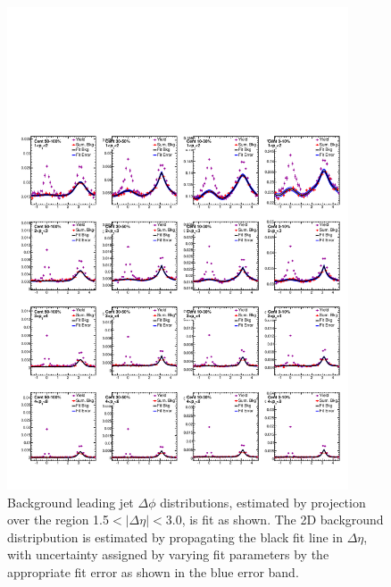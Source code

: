 \begin{figure}[hbtp]
\begin{center}
\includegraphics[width=0.9\textwidth]{figures/Appendices/Fits_PbPb_Leading.pdf}
\caption[Leading jet background fits]{Background leading jet $\Delta\phi$ distributions, estimated by projection over the region 1.5$<|\Delta\eta|<$3.0, is fit as shown.  The 2D background distripbution is estimated by propagating the black fit line in $\Delta\eta$, with uncertainty assigned by varying fit parameters by the appropriate fit error as shown in the blue error band.}
\end{center}
\end{figure}


